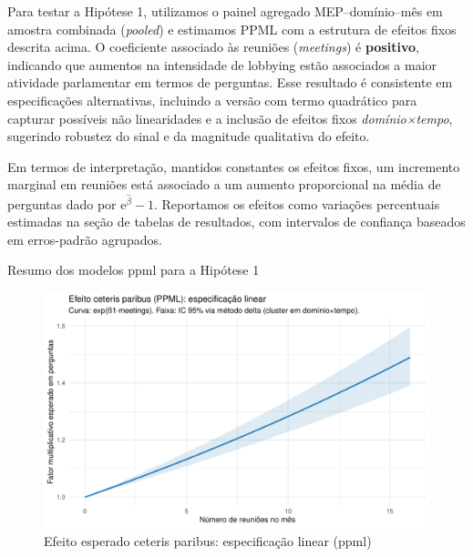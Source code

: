 Para testar a Hipótese 1, utilizamos o painel agregado MEP–domínio–mês em amostra combinada (\textit{pooled}) e estimamos PPML com a estrutura de efeitos fixos descrita acima. O coeficiente associado às reuniões (\textit{meetings}) é \textbf{positivo}, indicando que aumentos na intensidade de lobbying estão associados a maior atividade parlamentar em termos de perguntas. Esse resultado é consistente em especificações alternativas, incluindo a versão com termo quadrático para capturar possíveis não linearidades e a inclusão de efeitos fixos \textit{domínio×tempo}, sugerindo robustez do sinal e da magnitude qualitativa do efeito.

Em termos de interpretação, mantidos constantes os efeitos fixos, um incremento marginal em reuniões está associado a um aumento proporcional na média de perguntas dado por \(\mathrm{e}^{\hat{\beta}}-1\). Reportamos os efeitos como variações percentuais estimadas na seção de tabelas de resultados, com intervalos de confiança baseados em erros-padrão agrupados.

\begin{table}[htbp]
\centering
\caption{Resumo dos modelos \acrshort{ppml} para a Hipótese 1}
\label{tab:ppml_h1_both}

\end{table}

\begin{figure}[htbp]
\centering
\includegraphics[width=\textwidth]{figures/h1_test/fig_effect_linear_ppml.pdf}
\caption{Efeito esperado ceteris paribus: especificação linear (\acrshort{ppml})}
\label{fig:effect_linear_ppml}
\end{figure}

